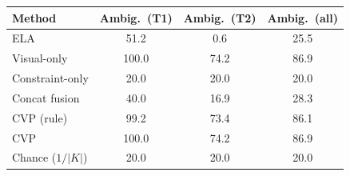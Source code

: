 \begin{tabular}{lccc}
\toprule
Method & Ambig.\ (T1) & Ambig.\ (T2) & Ambig.\ (all)\\
\midrule
ELA & 51.2 & 0.6 & 25.5\\
Visual-only & 100.0 & 74.2 & 86.9\\
Constraint-only & 20.0 & 20.0 & 20.0\\
Concat fusion & 40.0 & 16.9 & 28.3\\
CVP (rule) & 99.2 & 73.4 & 86.1\\
CVP & 100.0 & 74.2 & 86.9\\
\midrule
Chance ($1/|K|$) & 20.0 & 20.0 & 20.0\\
\bottomrule
\end{tabular}
